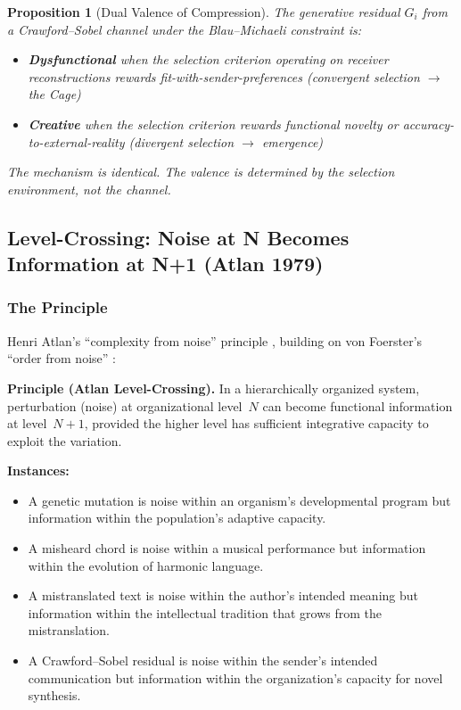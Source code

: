 \documentclass[12pt,letterpaper]{article}
\newtheorem{proposition}[theorem]{Proposition}
\theoremstyle{definition}
\theoremstyle{remark}
\begin{document}
\begin{proposition}[Dual Valence of Compression]
\label{prop:dualvalence}
The generative residual $G_i$ from a Crawford--Sobel channel under the Blau--Michaeli constraint is:
\begin{itemize}
    \item \textbf{Dysfunctional} when the selection criterion operating on receiver reconstructions rewards fit-with-sender-preferences (convergent selection $\to$ the Cage)
    \item \textbf{Creative} when the selection criterion rewards functional novelty or accuracy-to-external-reality (divergent selection $\to$ emergence)
\end{itemize}
The mechanism is identical. The valence is determined by the selection environment, not the channel.
\end{proposition}


\subsection{Level-Crossing: Noise at N Becomes Information at N+1 (Atlan 1979)}

\subsubsection{The Principle}

Henri Atlan's ``complexity from noise'' principle \citep{atlan1979}, building on von Foerster's ``order from noise'' \citep{vonfoerster1960}:

\textbf{Principle (Atlan Level-Crossing).} In a hierarchically organized system, perturbation (noise) at organizational level~$N$ can become functional information at level~$N{+}1$, provided the higher level has sufficient integrative capacity to exploit the variation.

\textbf{Instances:}
\begin{itemize}
    \item A genetic mutation is noise within an organism's developmental program but information within the population's adaptive capacity.
    \item A misheard chord is noise within a musical performance but information within the evolution of harmonic language.
    \item A mistranslated text is noise within the author's intended meaning but information within the intellectual tradition that grows from the mistranslation.
    \item A Crawford--Sobel residual is noise within the sender's intended communication but information within the organization's capacity for novel synthesis.
\end{itemize}
\end{document}
